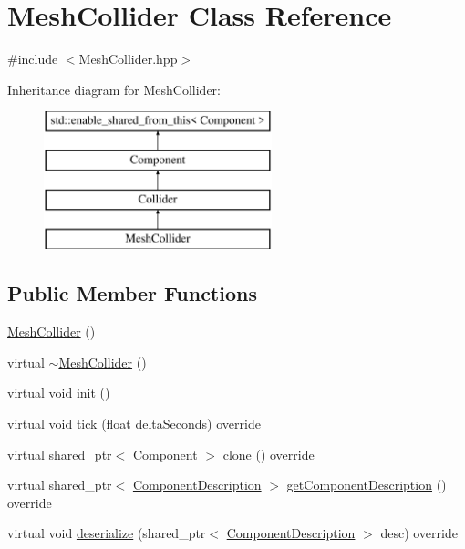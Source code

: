 \hypertarget{class_mesh_collider}{}\section{Mesh\+Collider Class Reference}
\label{class_mesh_collider}


{\ttfamily \#include $<$Mesh\+Collider.\+hpp$>$}

Inheritance diagram for Mesh\+Collider\+:\begin{figure}[H]
\begin{center}
\leavevmode
\includegraphics[height=4.000000cm]{class_mesh_collider}
\end{center}
\end{figure}
\subsection*{Public Member Functions}
\begin{DoxyCompactItemize}
\item 
\hyperlink{class_mesh_collider_ad7fdf5eb86b61c6edae3dfb48ea3ea03}{Mesh\+Collider} ()
\item 
virtual \hyperlink{class_mesh_collider_a1f026b06c7241d4f96e4bb2c6cc4fcc7}{$\sim$\+Mesh\+Collider} ()
\item 
virtual void \hyperlink{class_mesh_collider_ac906075dfa0f6ea801d82738c4b09231}{init} ()
\item 
virtual void \hyperlink{class_mesh_collider_a3d68ab01f24a654638319600ac720d57}{tick} (float delta\+Seconds) override
\item 
virtual shared\+\_\+ptr$<$ \hyperlink{class_component}{Component} $>$ \hyperlink{class_mesh_collider_a9965a490a1e945858dd9f1601b239878}{clone} () override
\item 
virtual shared\+\_\+ptr$<$ \hyperlink{class_component_description}{Component\+Description} $>$ \hyperlink{group__serialization__functions_ga92153fe80d9c2dcc91ce36050992f1d9}{get\+Component\+Description} () override
\item 
virtual void \hyperlink{group__serialization__functions_ga668f25c331d9519dfbd5f51a300cbb13}{deserialize} (shared\+\_\+ptr$<$ \hyperlink{class_component_description}{Component\+Description} $>$ desc) override
\end{DoxyCompactItemize}
